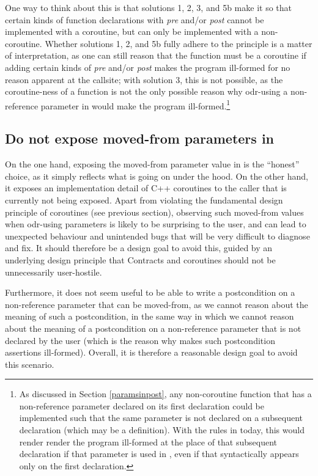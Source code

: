 One way to think about this is that solutions 1, 2, 3, and 5b make it so that certain kinds of function declarations with \emph{pre} and/or \emph{post} cannot be implemented with a coroutine, but can only be implemented with a non-coroutine. Whether solutions 1, 2, and 5b fully adhere to the principle is a matter of interpretation, as one can still reason that the function must be a coroutine if adding certain kinds of \emph{pre} and/or \emph{post} makes the program ill-formed for no reason apparent at the callsite; with solution 3, this is not possible, as the coroutine-ness of a function is not the only possible reason why odr-using a non-reference parameter in  would make the program ill-formed.\footnote{As discussed in Section \ref{paramsinpost}, any non-coroutine function that has a non-reference parameter declared  on its first declaration could be implemented such that the same parameter is not declared  on a subsequent declaration (which may be a definition). With the rules in \cite{P2900R8} today, this would render  render the program ill-formed at the place of that subsequent declaration if that parameter is used in , even if that  syntactically appears only on the first declaration.}

\subsection{Do not expose moved-from parameters in }

On the one hand, exposing the moved-from parameter value in  is the ``honest'' choice, as it simply reflects what is going on under the hood. On the other hand, it exposes an implementation detail of C++ coroutines to the caller that is currently not being exposed. Apart from violating the fundamental design principle of coroutines (see previous section), observing such moved-from values when odr-using  parameters is likely to be surprising to the user, and can lead to unexpected behaviour and unintended bugs that will be very difficult to diagnose and fix. It should therefore be a design goal to avoid this, guided by an underlying design principle that Contracts and coroutines should not be unnecessarily user-hostile.

Furthermore, it does not seem useful to be able to write a postcondition on a non-reference parameter that can be moved-from, as we cannot reason about the meaning of such a postcondition, in the same way in which we cannot reason about the meaning of a postcondition on a non-reference parameter that is not declared  by the user (which is the reason why \cite{P2900R8} makes such postcondition assertions ill-formed). Overall, it is therefore a reasonable design goal to avoid this scenario.

